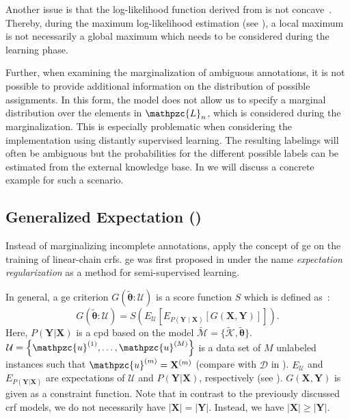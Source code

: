 Another issue is that the log-likelihood function derived from  is not concave~\citep{tsuboi2008training}.
Thereby, during the maximum log-likelihood estimation (see ), a local maximum is not necessarily a global maximum which needs to be considered during the learning phase.

Further, when examining the marginalization of \glspl{ambiguous annotation}, it is not possible to provide additional information on the distribution of possible assignments.
In this form, the model does not allow us to specify a \gls{marginal distribution} over the elements in $\mathpzc{L}_n$, which is considered during the marginalization.
This is especially problematic when considering the implementation using distantly supervised learning.
The resulting labelings will often be ambiguous but the probabilities for the different possible labels can be estimated from the external knowledge base.
In  we will discuss a concrete example for such a scenario.

\subsection{Generalized Expectation ()}\label{subsec:generalized-expectation}

Instead of marginalizing incomplete annotations, \citet{mann2008generalized} apply the concept of \acrfull{ge} on the training of linear-chain \glspl{crf}.
\Gls{ge} was first proposed in \citet{mann2007simple} under the name \textit{expectation regularization} as a method for semi-supervised learning.

In general, a \gls{ge} criterion $G(\bm{\tilde{\theta}}:\mathcal{U})$ is a score function $S$ which is defined as~\citep{mann2010generalized}:
\begin{equation}
  \label{equ:generalized-expectation}
  G(\bm{\tilde{\theta}}:\mathcal{U})=S\left(E_{\mathcal{U}}\left[E_{P(\mathbf{Y}\mid\mathbf{X})}\left[G(\mathbf{X},\mathbf{Y})\right]\right]\right).
\end{equation}
Here, $P(\mathbf{Y}|\mathbf{X})$ is a \gls{cpd} based on the model $\tilde{\mathcal{M}}=\{\tilde{\mathcal{K}},\bm{\tilde{\theta}}\}$.
$\mathcal{U}=\left\{\mathpzc{u}^{(1)},\dots,\mathpzc{u}^{(M)}\right\}$ is a data set of $M$ unlabeled instances such that $\mathpzc{u}^{(m)}=\mathbf{X}^{(m)}$ (compare with $\mathcal{D}$ in ).
$E_{\mathcal{U}}$ and $E_{P(\mathbf{Y}|\mathbf{X})}$ are expectations of $\mathcal{U}$ and $P(\mathbf{Y}|\mathbf{X})$, respectively (see ).
$G(\mathbf{X},\mathbf{Y})$ is given as a constraint function.
Note that in contrast to the previously discussed \gls{crf} models, we do not necessarily have $|\mathbf{X}|=|\mathbf{Y}|$.
Instead, we have $|\mathbf{X}|\geq|\mathbf{Y}|$.

